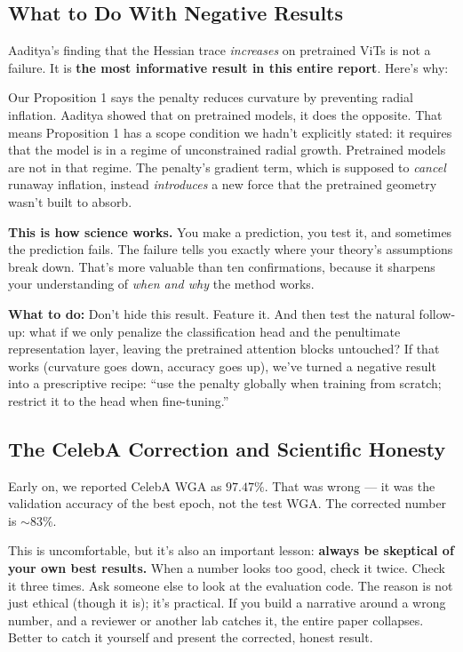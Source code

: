 \documentclass[11pt,a4paper]{article}
\begin{document}
\subsection{What to Do With Negative Results}

Aaditya's finding that the Hessian trace \emph{increases} on pretrained ViTs is not a failure. It is \textbf{the most informative result in this entire report}. Here's why:

Our Proposition 1 says the penalty reduces curvature by preventing radial inflation. Aaditya showed that on pretrained models, it does the opposite. That means Proposition 1 has a scope condition we hadn't explicitly stated: it requires that the model is in a regime of unconstrained radial growth. Pretrained models are not in that regime. The penalty's gradient term, which is supposed to \emph{cancel} runaway inflation, instead \emph{introduces} a new force that the pretrained geometry wasn't built to absorb.

\textbf{This is how science works.} You make a prediction, you test it, and sometimes the prediction fails. The failure tells you exactly where your theory's assumptions break down. That's more valuable than ten confirmations, because it sharpens your understanding of \emph{when and why} the method works.

\textbf{What to do:} Don't hide this result. Feature it. And then test the natural follow-up: what if we only penalize the classification head and the penultimate representation layer, leaving the pretrained attention blocks untouched? If that works (curvature goes down, accuracy goes up), we've turned a negative result into a prescriptive recipe: ``use the penalty globally when training from scratch; restrict it to the head when fine-tuning.''

\subsection{The CelebA Correction and Scientific Honesty}

Early on, we reported CelebA WGA as $97.47\%$. That was wrong --- it was the validation accuracy of the best epoch, not the test WGA. The corrected number is $\sim83\%$.

This is uncomfortable, but it's also an important lesson: \textbf{always be skeptical of your own best results.} When a number looks too good, check it twice. Check it three times. Ask someone else to look at the evaluation code. The reason is not just ethical (though it is); it's practical. If you build a narrative around a wrong number, and a reviewer or another lab catches it, the entire paper collapses. Better to catch it yourself and present the corrected, honest result.
\end{document}
